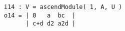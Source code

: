 \documentclass{amsart}
\begin{document}
\begin{example}
\medskip
\begin{verbatim}
i14 : V = ascendModule( 1, A, U )
o14 = | 0   a  bc  |
      | c+d d2 a2d |
\end{verbatim}
\medskip


\end{example}








\end{document}
